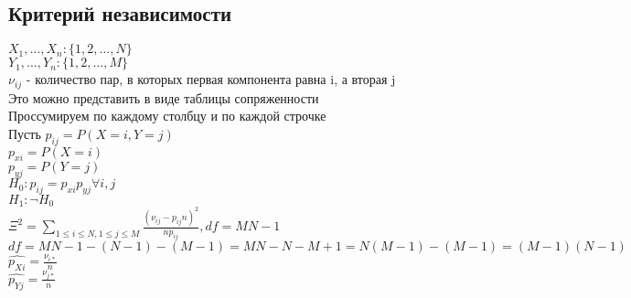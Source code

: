 \documentclass{article}
\newcommand\0{\mathbb{0}}
\newcommand\1{\mathbb{1}}
\begin{document}
\subsection{Критерий независимости}
$X_1, \dots, X_n: \{1, 2, \dots, N\}$\\
$Y_1, \dots, Y_n: \{1, 2, \dots, M\}$\\
$\nu_{ij}$ - количество пар, в которых первая компонента равна i, а вторая j\\
Это можно представить в виде таблицы  сопряженности\\
Проссумируем по каждому столбцу и по каждой строчке\\
Пусть $p_{ij} = P(X = i, Y = j)$\\
$p_{xi} = P(X = i)$\\
$p_{yj} = P(Y = j)$\\
$H_0: p_{ij} = p_{xi} p_{yj} \forall i, j$\\
$H_1: \neg H_0$\\
$\Xi^2 = \displaystyle\sum_{1 \leq i \leq N, 1 \leq j \leq M} \frac{(\nu_{ij} - p_{ij}n)^2}{np_{ij}}, df = MN - 1$\\
$df = MN - 1 - (N - 1) - (M - 1) = MN - N - M + 1 = N(M - 1) - (M - 1) = (M - 1)(N - 1)$\\
$\widehat{p_{Xi}} = \frac{\nu_{i*}}{n}$\\
$\widehat{p_{Yj}} = \frac{\nu_{j*}}{n}$\\
\end{document}
